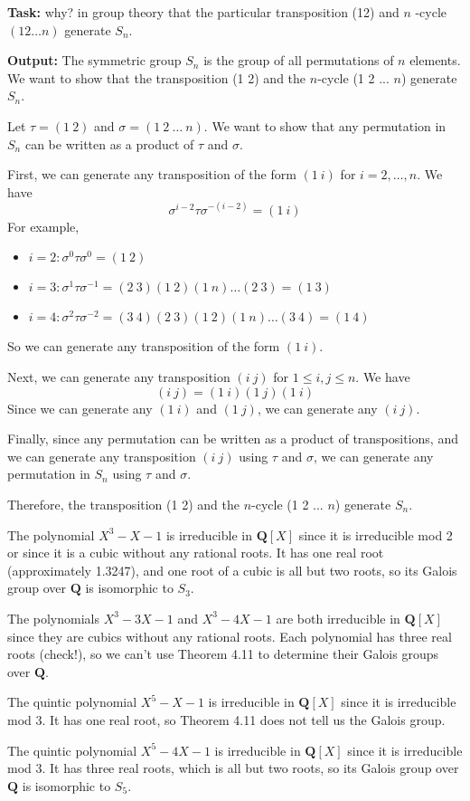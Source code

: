 \textbf{Task:} why? in group theory that the particular transposition (12) and $n$ -cycle $(12 \ldots n)$ generate $S_n$.

\textbf{Output:}
The symmetric group $S_n$ is the group of all permutations of $n$ elements. We want to show that the transposition (1 2) and the $n$-cycle (1 2 ... $n$) generate $S_n$.

Let $\tau = (1\ 2)$ and $\sigma = (1\ 2\ \dots\ n)$. We want to show that any permutation in $S_n$ can be written as a product of $\tau$ and $\sigma$.

First, we can generate any transposition of the form $(1\ i)$ for $i = 2, \dots, n$. We have
\[
\sigma^{i-2} \tau \sigma^{-(i-2)} = (1\ i)
\]
For example,

\begin{itemize}
	\item $i = 2: \sigma^0 \tau \sigma^0 = (1\ 2)$
	\item $i = 3: \sigma^1 \tau \sigma^{-1} = (2\ 3)(1\ 2)(1\ n) \dots (2\ 3) = (1\ 3)$
	\item $i = 4: \sigma^2 \tau \sigma^{-2} = (3\ 4)(2\ 3)(1\ 2)(1\ n) \dots (3\ 4) = (1\ 4)$
\end{itemize}

So we can generate any transposition of the form $(1\ i)$.

Next, we can generate any transposition $(i\ j)$ for $1 \le i, j \le n$. We have
\[
(i\ j) = (1\ i)(1\ j)(1\ i)
\]
Since we can generate any $(1\ i)$ and $(1\ j)$, we can generate any $(i\ j)$.

Finally, since any permutation can be written as a product of transpositions, and we can generate any transposition $(i\ j)$ using $\tau$ and $\sigma$, we can generate any permutation in $S_n$ using $\tau$ and $\sigma$.

Therefore, the transposition (1 2) and the $n$-cycle (1 2 ... $n$) generate $S_n$.


\begin{example}[4.13]
The polynomial $X^3-X-1$ is irreducible in $\mathbf{Q}[X]$ since it is irreducible mod 2 or since it is a cubic without any rational roots. It has one real root (approximately 1.3247), and one root of a cubic is all but two roots, so its Galois group over $\mathbf{Q}$ is isomorphic to $S_3$.
\end{example}
\begin{example}[4.14]
The polynomials $X^3-3 X-1$ and $X^3-4 X-1$ are both irreducible in $\mathbf{Q}[X]$ since they are cubics without any rational roots. Each polynomial has three real roots (check!), so we can't use Theorem 4.11 to determine their Galois groups over $\mathbf{Q}$.
\end{example}
\begin{example}[4.15]
The quintic polynomial $X^5-X-1$ is irreducible in $\mathbf{Q}[X]$ since it is irreducible mod 3. It has one real root, so Theorem 4.11 does not tell us the Galois group.
\end{example}
\begin{example}[4.16]
The quintic polynomial $X^5-4 X-1$ is irreducible in $\mathbf{Q}[X]$ since it is irreducible mod 3. It has three real roots, which is all but two roots, so its Galois group over $\mathbf{Q}$ is isomorphic to $S_5$.
\end{example}
